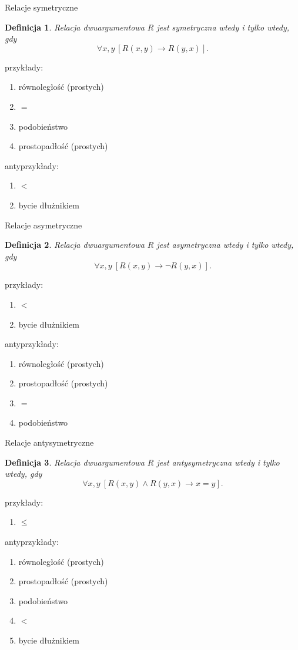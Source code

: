 \documentclass{beamer}
\newtheorem{definicja}{Definicja}
\begin{document}
\begin{frame}{Relacje symetryczne}
%
\begin{definicja}
Relacja dwuargumentowa $R$ jest \emph{symetryczna} wtedy i tylko wtedy, gdy $$\forall x,y ~[R(x,y) \to R(y, x)].$$
\end{definicja}
%
przykłady:
\begin{enumerate}
\item równoległość (prostych)
\item $=$
\item podobieństwo
\item prostopadłość (prostych)
\end{enumerate}
%
antyprzykłady:
\begin{enumerate}
\item $<$
\item bycie dłużnikiem
\end{enumerate}
\end{frame}

\begin{frame}{Relacje asymetryczne}
%
\begin{definicja}
Relacja dwuargumentowa $R$ jest \emph{asymetryczna} wtedy i tylko wtedy, gdy $$\forall x,y ~[R(x,y) \to \neg R(y, x)].$$
\end{definicja}
%
przykłady:
\begin{enumerate}
\item $<$
\item bycie dłużnikiem
\end{enumerate}
%
antyprzykłady:
\begin{enumerate}
\item równoległość (prostych)
\item prostopadłość (prostych)
\item $=$
\item podobieństwo
\end{enumerate}
\end{frame}

\begin{frame}{Relacje antysymetryczne}
%
\begin{definicja}
Relacja dwuargumentowa $R$ jest \emph{antysymetryczna} wtedy i tylko wtedy, gdy $$\forall x,y ~[R(x,y) \land R(y, x) \to x=y].$$
\end{definicja}
%
przykłady:
\begin{enumerate}
\item $\leq$
\end{enumerate}
%
antyprzykłady:
\begin{enumerate}
\item równoległość (prostych)
\item prostopadłość (prostych)
\item podobieństwo
\item $<$
\item bycie dłużnikiem
\end{enumerate}
\end{frame}
\end{document}
